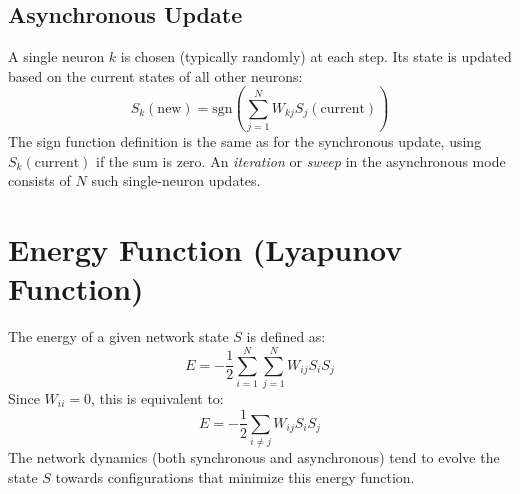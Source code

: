 \documentclass{article}
\begin{document}
\subsection{Asynchronous Update}
A single neuron $k$ is chosen (typically randomly) at each step. Its state is updated based on the current states of all other neurons:
\[
S_k(\text{new}) = \text{sgn} \left( \sum_{j=1}^{N} W_{kj} S_j(\text{current}) \right)
\]
The sign function definition is the same as for the synchronous update, using $S_k(\text{current})$ if the sum is zero.
An \textit{iteration} or \textit{sweep} in the asynchronous mode consists of $N$ such single-neuron updates.

\section{Energy Function (Lyapunov Function)}
The energy of a given network state $S$ is defined as:
\[
E = -\frac{1}{2} \sum_{i=1}^{N} \sum_{j=1}^{N} W_{ij} S_i S_j
\]
Since $W_{ii} = 0$, this is equivalent to:
\[
E = -\frac{1}{2} \sum_{i \neq j} W_{ij} S_i S_j
\]
The network dynamics (both synchronous and asynchronous) tend to evolve the state $S$ towards configurations that minimize this energy function.
\end{document}
